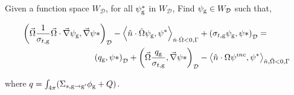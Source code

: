 Given a function space $W_\mathcal{D}$, for all $\psi^*_{\mathrm{g}}$ in $W_\mathcal{D}$, Find $\psi_{\mathrm{g}} \in W_\mathcal{D}$ such that,

\begin{equation}
\begin{split}


        \left ( \vec{\Omega}\frac{1}{\sigma_{t, \rg}}\vec{\Omega}\cdot \vec{\nabla}\psi_\rg, \vec{\nabla}\psi* \right)_\mathcal{D} -     \left < \hat{n} \cdot \hat{\Omega}\psi_\rg, \psi^* \right>_{\hat{n} \cdot \hat{\Omega} < 0, \Gamma} &+ \left ( \sigma_{t, \rg} \psi_\rg, \psi* \right )_\mathcal{D} = \\
        \left ( q_\rg, \psi* \right)_\mathcal{D} + \left ( \vec{\Omega} \frac{q_\rg}{\sigma_{t, \rg}}, \vec{\nabla}\psi* \right)_\mathcal{D} &- \left < \hat{n} \cdot {\Omega} \psi^{inc}, \psi^* \right>_{\hat{n}, \hat{\Omega} <0, \Gamma} 
    \end{split}
\end{equation}

where $q = \int_{4\pi}(\Sigma_{s, \mathrm{g} \rightarrow \mathrm{g}'}\phi_{\mathrm{g}} + Q)$. 
\
